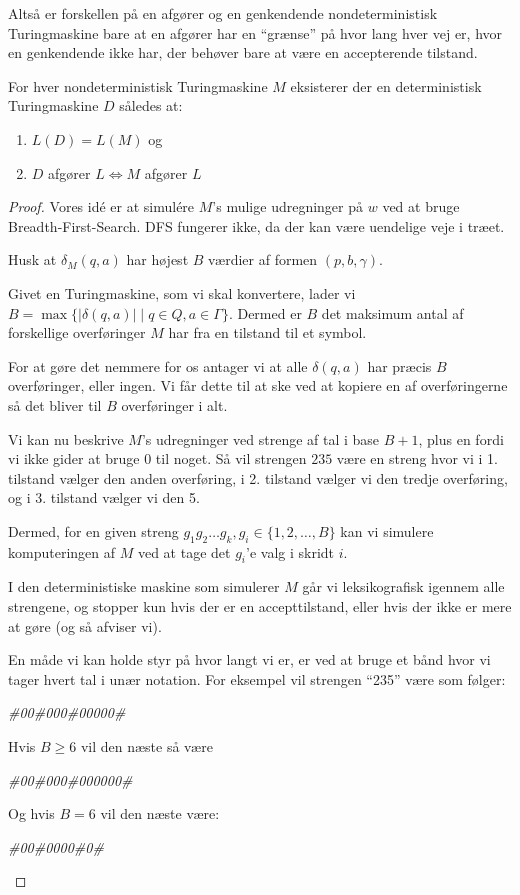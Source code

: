 Altså er forskellen på en afgører og en genkendende nondeterministisk Turingmaskine bare at en afgører har en ``grænse'' på hvor lang hver vej er, hvor en genkendende ikke har, der behøver bare at være en accepterende tilstand.

\begin{theorem}
	For hver nondeterministisk Turingmaskine $M$ eksisterer der en deterministisk Turingmaskine $D$ således at:
	\begin{enumerate}
		\item $L(D) = L(M)$ og
		\item $D$ afgører $L \iff M$ afgører $L$
	\end{enumerate}


\end{theorem}
\begin{proof}
	Vores idé er at simulére $M$'s mulige udregninger på $w$ ved at bruge Breadth-First-Search. DFS fungerer ikke, da der kan være uendelige veje i træet.

	Husk at \(\delta_{M}(q,a)\) har højest $B$ værdier af formen $(p, b, \gamma)$.

	Givet en Turingmaskine, som vi skal konvertere, lader vi $B = \max\{ | \delta(q,a) | \mid q \in Q, a \in \Gamma\}$. Dermed er $B$ det maksimum antal af forskellige overføringer $M$ har fra en tilstand til et symbol.

	For at gøre det nemmere for os antager vi at alle \(\delta(q,a)\) har præcis $B$ overføringer, eller ingen. Vi får dette til at ske ved at kopiere en af overføringerne så det bliver til $B$ overføringer i alt.

	Vi kan nu beskrive $M$'s udregninger ved strenge af tal i base $B+1$, plus en fordi vi ikke gider at bruge $0$ til noget. Så vil strengen $235$ være en streng hvor vi i 1. tilstand vælger den anden overføring, i 2. tilstand vælger vi den tredje overføring, og i 3. tilstand vælger vi den 5.

	Dermed, for en given streng $g_{1}g_{2}\ldots g_{k}, g_{i} \in \{1, 2, \ldots, B\}$ kan vi simulere komputeringen af $M$ ved at tage det $g_{i}$'e valg i skridt $i$.

	I den deterministiske maskine som simulerer $M$ går vi leksikografisk igennem alle strengene, og stopper kun hvis der er en accepttilstand, eller hvis der ikke er mere at gøre (og så afviser vi).

	En måde vi kan holde styr på hvor langt vi er, er ved at bruge et bånd hvor vi tager hvert tal i unær notation. For eksempel vil strengen ``235'' være som følger:
	\begin{center}
		\textit{\#00\#000\#00000\#}
	\end{center}
	Hvis $B \ge 6$ vil den næste så være
	\begin{center}
		\textit{\#00\#000\#000000\#}
	\end{center}
	Og hvis $B = 6$ vil den næste være:
	\begin{center}
		\textit{\#00\#0000\#0\#}
	\end{center}


\end{proof}
